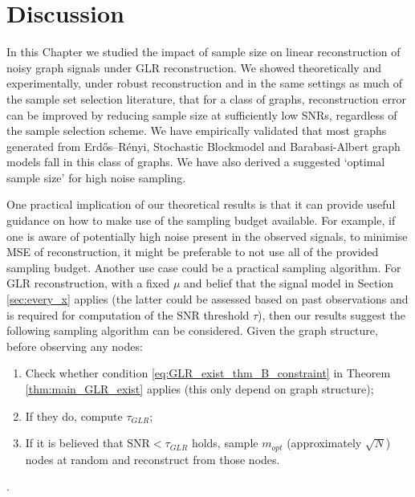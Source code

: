 \clearpage

\section{Discussion}
In this Chapter we studied the impact of sample size on linear reconstruction of noisy graph signals under GLR reconstruction. We showed theoretically and experimentally, under robust reconstruction and in the same settings as much of the sample set selection literature, that for a class of graphs, reconstruction error can be improved by reducing sample size at sufficiently low SNRs, regardless of the sample selection scheme. We have empirically validated that most graphs generated from Erdős–Rényi, Stochastic Blockmodel and Barabasi-Albert graph models fall in this class of graphs. We have also derived a suggested `optimal sample size' for high noise sampling.

One practical implication of our theoretical results is that it can provide useful guidance on how to make use of the sampling budget available. For example, if one is aware of potentially high noise present in the observed signals, to minimise MSE of reconstruction, it might be preferable to not use all of the provided sampling budget.
Another use case could be a practical sampling algorithm. For GLR reconstruction, with a fixed $\mu$ and belief that the signal model in Section \ref{sec:every_x} applies (the latter could be assessed based on past observations and is required for computation of the SNR threshold $\tau$), then our results suggest the following sampling algorithm can be considered. Given the graph structure, before observing any nodes:
\begin{enumerate}
    \item Check whether condition \eqref{eq:GLR_exist_thm_B_constraint} in Theorem \ref{thm:main_GLR_exist} applies (this only depend on graph structure);
    \item If they do, compute $\tau_{GLR}$;
    \item If it is believed that $\text{SNR} < \tau_{GLR}$ holds, sample $m_{opt}$ (approximately $\sqrt{N}$) nodes at random and reconstruct from those nodes.
\end{enumerate}

\cite{belkin2004regularization}.

